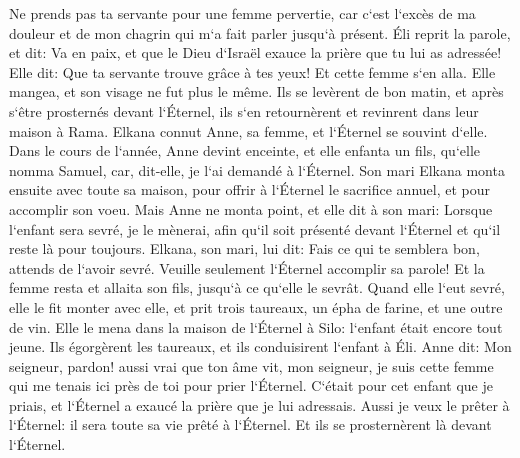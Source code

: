 \verse Ne prends pas ta servante pour une femme pervertie, car c`est l`excès de ma douleur et de mon chagrin qui m`a fait parler jusqu`à présent. 
\verse Éli reprit la parole, et dit: Va en paix, et que le Dieu d`Israël exauce la prière que tu lui as adressée! 
\verse Elle dit: Que ta servante trouve grâce à tes yeux! Et cette femme s`en alla. Elle mangea, et son visage ne fut plus le même. 
\verse Ils se levèrent de bon matin, et après s`être prosternés devant l`Éternel, ils s`en retournèrent et revinrent dans leur maison à Rama. Elkana connut Anne, sa femme, et l`Éternel se souvint d`elle. 
\verse Dans le cours de l`année, Anne devint enceinte, et elle enfanta un fils, qu`elle nomma Samuel, car, dit-elle, je l`ai demandé à l`Éternel. 
\verse Son mari Elkana monta ensuite avec toute sa maison, pour offrir à l`Éternel le sacrifice annuel, et pour accomplir son voeu. 
\verse Mais Anne ne monta point, et elle dit à son mari: Lorsque l`enfant sera sevré, je le mènerai, afin qu`il soit présenté devant l`Éternel et qu`il reste là pour toujours. 
\verse Elkana, son mari, lui dit: Fais ce qui te semblera bon, attends de l`avoir sevré. Veuille seulement l`Éternel accomplir sa parole! Et la femme resta et allaita son fils, jusqu`à ce qu`elle le sevrât. 
\verse Quand elle l`eut sevré, elle le fit monter avec elle, et prit trois taureaux, un épha de farine, et une outre de vin. Elle le mena dans la maison de l`Éternel à Silo: l`enfant était encore tout jeune. 
\verse Ils égorgèrent les taureaux, et ils conduisirent l`enfant à Éli. 
\verse Anne dit: Mon seigneur, pardon! aussi vrai que ton âme vit, mon seigneur, je suis cette femme qui me tenais ici près de toi pour prier l`Éternel. 
\verse C`était pour cet enfant que je priais, et l`Éternel a exaucé la prière que je lui adressais. 
\verse Aussi je veux le prêter à l`Éternel: il sera toute sa vie prêté à l`Éternel. Et ils se prosternèrent là devant l`Éternel. 

\chapter{}

